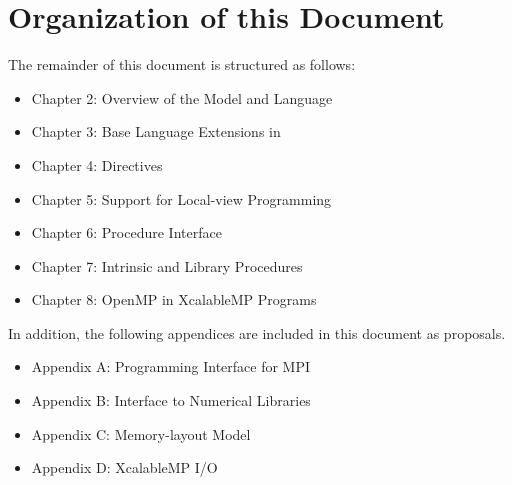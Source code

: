 \section{Organization of this Document}

The remainder of this document is structured as follows:

\begin{itemize}
 \item Chapter 2: Overview of the {\XMP} Model and Language
 \item Chapter 3: Base Language Extensions in {\XMPC}
 \item Chapter 4: Directives 
 \item Chapter 5: Support for Local-view Programming
 \item Chapter 6: Procedure Interface
 \item Chapter 7: Intrinsic and Library Procedures
 \item Chapter 8: OpenMP in XcalableMP Programs
\end{itemize}
%
In addition, the following appendices are included in this document as
proposals.
%
\begin{itemize}
 \item Appendix A: Programming Interface for MPI
 \item Appendix B: Interface to Numerical Libraries
 \item Appendix C: Memory-layout Model
 \item Appendix D: XcalableMP I/O
\end{itemize}


